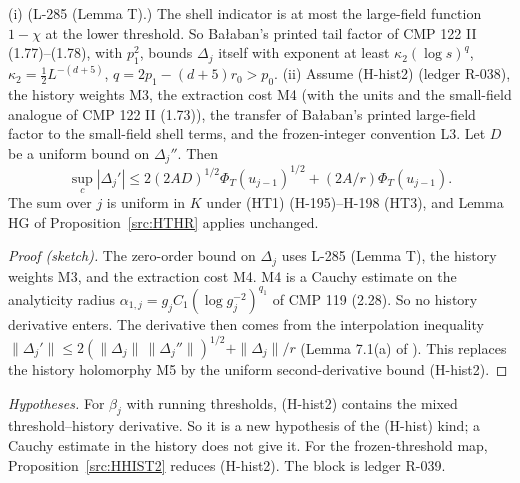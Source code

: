 \begin{proposition}\label{src:HTHR2}
(i) (L-285 (Lemma T).) The shell indicator is at most the large-field function $1-\chi$ at the lower threshold. So Ba{\l}aban's printed tail factor of CMP 122 II (1.77)--(1.78), with $p_1^2$, bounds $\Delta_j$ itself with exponent at least $\kappa_2(\log s)^q$, $\kappa_2=\tfrac12L^{-(d+5)}$, $q=2p_1-(d+5)r_0>p_0$.
(ii) Assume (H-hist2) (ledger R-038), the history weights M3, the extraction cost M4 (with the units and the small-field analogue of CMP 122 II (1.73)), the transfer of Ba{\l}aban's printed large-field factor to the small-field shell terms, and the frozen-integer convention L3. Let $D$ be a uniform bound on $\Delta_j''$. Then
\[\sup_c|\Delta_j'|\le2(2AD)^{1/2}\Phi_T(u_{j-1})^{1/2}+(2A/r)\Phi_T(u_{j-1}).\]
The sum over $j$ is uniform in $K$ under (HT1) (H-195)--H-198 (HT3), and Lemma HG of Proposition~\ref{src:HTHR} applies unchanged.
\end{proposition}
\begin{proof}[Proof (sketch)]
The zero-order bound on $\Delta_j$ uses L-285 (Lemma T), the history weights M3, and the extraction cost M4. M4 is a Cauchy estimate on the analyticity radius $\alpha_{1,j}=g_jC_1(\log g_j^{-2})^{q_1}$ of CMP 119 (2.28). So no history derivative enters. The derivative then comes from the interpolation inequality $\|\Delta_j'\|\le2(\|\Delta_j\|\,\|\Delta_j''\|)^{1/2}+\|\Delta_j\|/r$ (Lemma 7.1(a) of ). This replaces the history holomorphy M5 by the uniform second-derivative bound (H-hist2).
\end{proof}
\emph{Hypotheses.} For $\beta_j$ with running thresholds, (H-hist2) contains the mixed threshold--history derivative. So it is a new hypothesis of the (H-hist) kind; a Cauchy estimate in the history does not give it. For the frozen-threshold map, Proposition~\ref{src:HHIST2} reduces (H-hist2). The block is ledger R-039.

